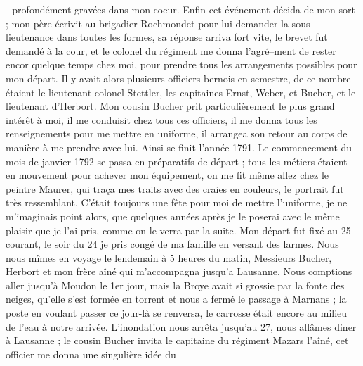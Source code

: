 \documentclass[12pt]{article}
\begin{document}
 - profondément gravées dans mon coeur. Enfin cet
événement décida de mon sort ; mon père écrivit au brigadier Rochmondet pour lui demander la
sous-lieutenance dans toutes les formes, sa réponse arriva fort vite, le brevet fut demandé à la
cour, et le colonel du régiment me donna l’agré–ment de rester encor quelque temps chez moi, pour
prendre tous les arrangements possibles pour mon départ. Il y avait alors plusieurs officiers
bernois en semestre, de ce nombre étaient le lieutenant-colonel Stettler, les capitaines Ernst,
Weber, et Bucher, et le lieutenant d’Herbort. Mon cousin Bucher prit particulièrement le plus grand
intérêt à moi, il me conduisit chez tous ces officiers, il me donna tous les renseignements pour me
mettre en uniforme, il arrangea son retour au corps de manière à me prendre avec lui. Ainsi se finit
l’année 1791. Le commencement du mois de janvier 1792 se passa en préparatifs de départ ; tous les
métiers étaient en mouvement pour achever mon équipement, on me fit même allez chez le peintre
Maurer, qui traça mes traits avec des craies en couleurs, le portrait fut très ressemblant. C’était
toujours une fête pour moi de mettre l’uniforme, je ne m’imaginais point alors, que quelques années
après je le poserai avec le même plaisir que je l’ai pris, comme on le verra par la suite. Mon
départ fut fixé au 25 courant, le soir du 24 je pris congé de ma famille en versant des larmes. Nous
nous mîmes en voyage le lendemain à 5 heures du matin, Messieurs Bucher, Herbort et mon frère aîné
qui m’accompagna jusqu’a Lausanne. Nous comptions aller jusqu’à Moudon le 1er jour, mais la Broye
avait si grossie par la fonte des neiges, qu’elle s’est formée en torrent et nous a fermé le passage
à Marnans ; la poste en voulant passer ce jour-là se renversa, le carrosse était encore au milieu de
l’eau à notre arrivée. L’inondation nous arrêta jusqu’au 27, nous allâmes diner à Lausanne ; le
cousin Bucher invita le capitaine du régiment Mazars l’aîné, cet officier me donna une singulière
idée du
\end{document}

